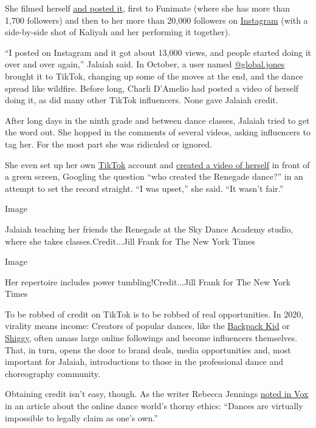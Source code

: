She filmed herself \href{https://www.instagram.com/p/B22za3xD1Fh/}{and
posted it}, first to Funimate (where she has more than 1,700 followers)
and then to her more than 20,000 followers on
\href{https://www.instagram.com/_.xoxlaii/}{Instagram} (with a
side-by-side shot of Kaliyah and her performing it together).

``I posted on Instagram and it got about 13,000 views, and people
started doing it over and over again,'' Jalaiah said. In October, a user
named \href{https://www.tiktok.com/@global.jones}{@global.jones} brought
it to TikTok, changing up some of the moves at the end, and the dance
spread like wildfire. Before long, Charli D'Amelio had posted a video of
herself doing it, as did many other TikTok influencers. None gave
Jalaiah credit.

After long days in the ninth grade and between dance classes, Jalaiah
tried to get the word out. She hopped in the comments of several videos,
asking influencers to tag her. For the most part she was ridiculed or
ignored.

She even set up her own \href{https://www.tiktok.com/@_.xoxlaii}{TikTok}
account and
\href{https://www.tiktok.com/@_.xoxlaii/video/6785619884479876358}{created
a video of herself} in front of a green screen, Googling the question
``who created the Renegade dance?'' in an attempt to set the record
straight. ``I was upset,'' she said. ``It wasn't fair.''

Image

Jalaiah teaching her friends the Renegade at the Sky Dance Academy
studio, where she takes classes.Credit...Jill Frank for The New York
Times

Image

Her repertoire includes power tumbling!Credit...Jill Frank for The New
York Times

To be robbed of credit on TikTok is to be robbed of real opportunities.
In 2020, virality means income: Creators of popular dances, like the
\href{https://www.abc.net.au/news/2018-12-19/floss-dance-creator-backpack-kids-sues-fortnite/10633962}{Backpack
Kid} or
\href{https://abcnews.go.com/Entertainment/shiggy-feelings-challenge-changed-life/story?id=59782945}{Shiggy},
often amass large online followings and become influencers themselves.
That, in turn, opens the door to brand deals, media opportunities and,
most important for Jalaiah, introductions to those in the professional
dance and choreography community.

Obtaining credit isn't easy, though. As the writer Rebecca Jennings
\href{https://www.vox.com/the-goods/2020/2/4/21112444/renegade-tiktok-song-dance}{noted
in Vox} in an article about the online dance world's thorny ethics:
``Dances are virtually impossible to legally claim as one's own.''

